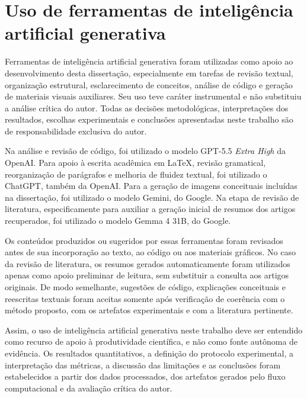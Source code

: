 \section{Uso de ferramentas de inteligência artificial generativa}
\label{sec:met_uso_ia}

Ferramentas de inteligência artificial generativa foram utilizadas como apoio ao
desenvolvimento desta dissertação, especialmente em tarefas de revisão textual,
organização estrutural, esclarecimento de conceitos, análise de código e
geração de materiais visuais auxiliares. Seu uso teve caráter instrumental e
não substituiu a análise crítica do autor. Todas as decisões metodológicas,
interpretações dos resultados, escolhas experimentais e conclusões apresentadas
neste trabalho são de responsabilidade exclusiva do autor.

Na análise e revisão de código, foi utilizado o modelo GPT-5.5 \textit{Extra High} da
OpenAI. Para apoio à escrita acadêmica em \LaTeX{}, revisão gramatical,
reorganização de parágrafos e melhoria de fluidez textual, foi utilizado o
ChatGPT, também da OpenAI. Para a geração de imagens conceituais incluídas na
dissertação, foi utilizado o modelo Gemini, do Google. Na etapa de revisão de
literatura, especificamente para auxiliar a geração inicial de resumos dos
artigos recuperados, foi utilizado o modelo Gemma 4 31B, do Google.

Os conteúdos produzidos ou sugeridos por essas ferramentas foram revisados antes
de sua incorporação ao texto, ao código ou aos materiais gráficos. No caso da
revisão de literatura, os resumos gerados automaticamente foram utilizados
apenas como apoio preliminar de leitura, sem substituir a consulta aos artigos
originais. De modo semelhante, sugestões de código, explicações conceituais e
reescritas textuais foram aceitas somente após verificação de coerência com o
método proposto, com os artefatos experimentais e com a literatura pertinente.

Assim, o uso de inteligência artificial generativa neste trabalho deve ser
entendido como recurso de apoio à produtividade científica, e não como fonte
autônoma de evidência. Os resultados quantitativos, a definição do protocolo
experimental, a interpretação das métricas, a discussão das limitações e as
conclusões foram estabelecidos a partir dos dados processados, dos artefatos
gerados pelo fluxo computacional e da avaliação crítica do autor.
